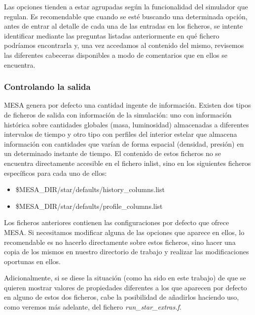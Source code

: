 Las opciones tienden a estar agrupadas según la funcionalidad del simulador que regulan. Es recomendable que cuando se esté buscando una determinada opción, antes de entrar al detalle de cada una de las entradas en los ficheros, se intente identificar mediante las preguntas listadas anteriormente en qué fichero podríamos encontrarla y, una vez accedamos al contenido del mismo, revisemos las diferentes cabeceras disponibles a modo de comentarios que en ellos se encuentra.

\subsubsection{Controlando la salida}
MESA genera por defecto una cantidad ingente de información. Existen dos tipos de ficheros de salida con información de la simulación: uno con información histórica sobre cantidades globales (masa, luminosidad) almacenadas a diferentes intervalos de tiempo y otro tipo con perfiles del interior estelar que almacena información con cantidades que varían de forma espacial (densidad, presión) en un determinado instante de tiempo. El contenido de estos ficheros no se encuentra directamente accesible en el fichero inlist, sino en los siguientes ficheros específicos para cada uno de ellos:

\begin{itemize}
    \item \$MESA\_DIR/star/defaults/history\_columns.list
    \item \$MESA\_DIR/star/defaults/profile\_columns.list
\end{itemize}

Los ficheros anteriores contienen las configuraciones por defecto que ofrece MESA. Si necesitamos modificar alguna de las opciones que aparece en ellos, lo recomendable es no hacerlo directamente sobre estos ficheros, sino hacer una copia de los mismos en nuestro directorio de trabajo y realizar las modificaciones oportunas en ellos.\par

Adicionalmente, si se diese la situación (como ha sido en este trabajo) de que se quieren mostrar valores de propiedades diferentes a los que aparecen por defecto en alguno de estos dos ficheros, cabe la posibilidad de añadirlos haciendo uso, como veremos más adelante, del fichero \textit{run\_star\_extras.f}.

